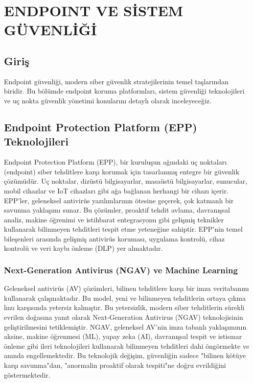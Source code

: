\chapter{ENDPOINT VE SİSTEM GÜVENLİĞİ}

\section*{Giriş}
Endpoint güvenliği, modern siber güvenlik stratejilerinin temel taşlarından biridir. Bu bölümde endpoint koruma platformları, sistem güvenliği teknolojileri ve uç nokta güvenlik yönetimi konularını detaylı olarak inceleyeceğiz.

\section{Endpoint Protection Platform (EPP) Teknolojileri}

Endpoint Protection Platform (EPP), bir kuruluşun ağındaki uç noktaları (endpoint) siber tehditlere karşı korumak için tasarlanmış entegre bir güvenlik çözümüdür. Uç noktalar, dizüstü bilgisayarlar, masaüstü bilgisayarlar, sunucular, mobil cihazlar ve IoT cihazları gibi ağa bağlanan herhangi bir cihazı içerir. EPP'ler, geleneksel antivirüs yazılımlarının ötesine geçerek, çok katmanlı bir savunma yaklaşımı sunar. Bu çözümler, proaktif tehdit avlama, davranışsal analiz, makine öğrenimi ve istihbarat entegrasyonu gibi gelişmiş teknikler kullanarak bilinmeyen tehditleri tespit etme yeteneğine sahiptir. EPP'nin temel bileşenleri arasında gelişmiş antivirüs koruması, uygulama kontrolü, cihaz kontrolü ve veri kaybı önleme (DLP) yer almaktadır.

\subsection{Next-Generation Antivirus (NGAV) ve Machine Learning}

Geleneksel antivirüs (AV) çözümleri, bilinen tehditlere karşı bir imza veritabanını kullanarak çalışmaktadır. Bu model, yeni ve bilinmeyen tehditlerin ortaya çıkma hızı karşısında yetersiz kalmıştır. Bu yetersizlik, modern siber tehditlerin sürekli evrilen doğasına yanıt olarak Next-Generation Antivirus (NGAV) teknolojisinin geliştirilmesini tetiklemiştir. NGAV, geleneksel AV'nin imza tabanlı yaklaşımının aksine, makine öğrenmesi (ML), yapay zeka (AI), davranışsal tespit ve istismar önleme gibi ileri teknolojileri kullanarak bilinmeyen tehditleri dahi öngörmekte ve anında engellemektedir. Bu teknolojik değişim, güvenliğin sadece "bilinen kötüye karşı savunma"dan, "anormalin proaktif olarak tespiti"ne doğru evrildiğini göstermektedir.

